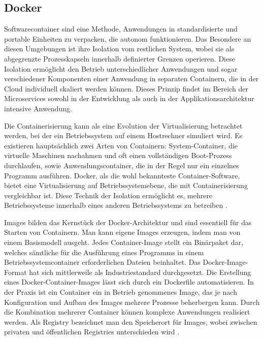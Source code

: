 {\subsection{Docker}

Softwarecontainer sind eine Methode, Anwendungen in standardisierte und portable Einheiten zu verpacken, die autonom funktionieren. Das Besondere an diesen Umgebungen ist ihre Isolation vom restlichen System, wobei sie als abgegrenzte Prozesskapseln innerhalb definierter Grenzen operieren. Diese Isolation ermöglicht den Betrieb unterschiedlicher Anwendungen und sogar verschiedener Komponenten einer Anwendung in separaten Containern, die in der Cloud individuell skaliert werden können. Dieses Prinzip findet im Bereich der Microservices sowohl in der Entwicklung als auch in der Applikationsarchitektur intensive Anwendung.

Die Containerisierung kann als eine Evolution der Virtualisierung betrachtet werden, bei der ein Betriebssystem auf einem Hostrechner simuliert wird. Es existieren hauptsächlich zwei Arten von Containern: System-Container, die virtuelle Maschinen nachahmen und oft einen vollständigen Boot-Prozess durchlaufen, sowie Anwendungscontainer, die in der Regel nur ein einzelnes Programm ausführen. Docker, als die wohl bekannteste Container-Software, bietet eine Virtualisierung auf Betriebssystemebene, die mit Containerisierung vergleichbar ist. Diese Technik der Isolation ermöglicht es, mehrere Betriebssysteme innerhalb eines anderen Betriebssystems zu betreiben \cite[S. 54-59]{stender} \cite[S.18]{burns1} \cite[S.63]{riti}.

\glqq Images\grqq{} bilden das Kernstück der Docker-Architektur und sind essentiell für das Starten von Containern. Man kann eigene Images erzeugen, indem man von einem Basismodell ausgeht. Jedes Container-Image stellt ein Binärpaket dar, welches sämtliche für die Ausführung eines Programms in einem Betriebssystemcontainer erforderlichen Dateien beinhaltet. Das Docker-Image-Format hat sich mittlerweile als Industriestandard durchgesetzt. Die Erstellung eines Docker-Container-Images lässt sich durch ein Dockerfile automatisieren. In der Praxis ist ein Container ein in Betrieb genommenes Image, das je nach Konfiguration und Aufbau des Images mehrere Prozesse beherbergen kann. Durch die Kombination mehrerer Container können komplexe Anwendungen realisiert werden. Als \glqq Registry\grqq{} bezeichnet man den Speicherort für Images, wobei zwischen privaten und öffentlichen Registries unterschieden wird \cite[S.16-18]{burns1} \cite[S.64-65]{riti}.

}
